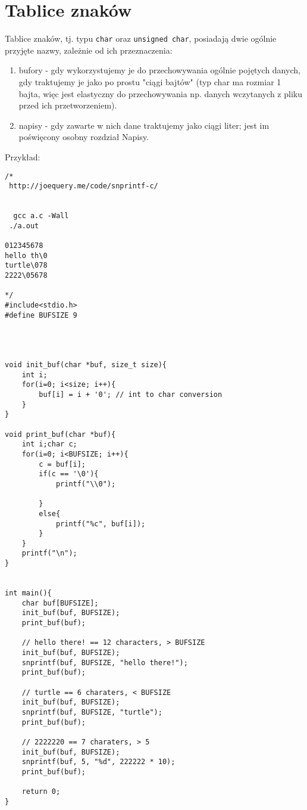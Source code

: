 \documentclass[11pt,a4paper]{article}
\begin{document}
\section*{Tablice znaków}
Tablice znaków, tj. typu \lstinline!char! oraz \lstinline!unsigned char!, posiadają dwie ogólnie przyjęte nazwy, zależnie od ich przeznaczenia:
\begin{enumerate}
\item bufory - gdy wykorzystujemy je do przechowywania ogólnie pojętych danych, gdy traktujemy je jako po prostu "ciągi bajtów" (typ char ma rozmiar 1 bajta, więc jest elastyczny do przechowywania np. danych wczytanych z pliku przed ich przetworzeniem).
\item napisy - gdy zawarte w nich dane traktujemy jako ciągi liter; jest im poświęcony osobny rozdział Napisy.
\end{enumerate}
Przykład:
\begin{lstlisting}
/*
 http://joequery.me/code/snprintf-c/
 
 
  gcc a.c -Wall
 ./a.out
 
012345678
hello th\0
turtle\078
2222\05678

*/ 
#include<stdio.h>
#define BUFSIZE 9




void init_buf(char *buf, size_t size){
    int i;
    for(i=0; i<size; i++){
        buf[i] = i + '0'; // int to char conversion
    }
}

void print_buf(char *buf){
    int i;char c;
    for(i=0; i<BUFSIZE; i++){
        c = buf[i];
        if(c == '\0'){
            printf("\\0");

        }
        else{
            printf("%c", buf[i]);
        }
    }
    printf("\n");
}


int main(){
    char buf[BUFSIZE];
    init_buf(buf, BUFSIZE);
    print_buf(buf);

    // hello there! == 12 characters, > BUFSIZE
    init_buf(buf, BUFSIZE);
    snprintf(buf, BUFSIZE, "hello there!");
    print_buf(buf);

    // turtle == 6 charaters, < BUFSIZE
    init_buf(buf, BUFSIZE);
    snprintf(buf, BUFSIZE, "turtle");
    print_buf(buf);

    // 2222220 == 7 charaters, > 5
    init_buf(buf, BUFSIZE);
    snprintf(buf, 5, "%d", 222222 * 10);
    print_buf(buf);

    return 0;
}
\end{lstlisting}
\end{document}
